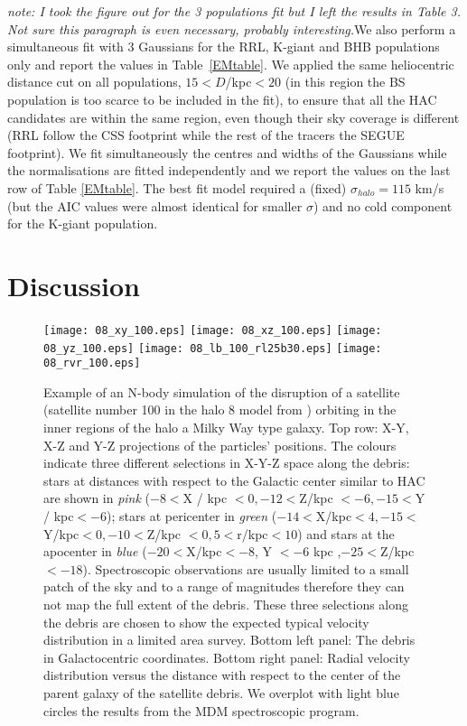 \documentclass[useAMS,usenatbib]{mn2e}
\begin{document}
\textit{note: I took the figure out for the 3 populations fit but I left the results in Table 3. Not sure this paragraph is even necessary, probably interesting.}We also perform a simultaneous fit with 3 Gaussians for the RRL, K-giant and BHB populations only and report the values in Table~\ref{EMtable}. We applied the same heliocentric distance cut on all populations, $15<D$/kpc$<20$ (in this region the BS population is too scarce to be included in the fit), to ensure that all the HAC candidates are within the same region, even though their sky coverage is different (RRL follow the CSS footprint while the rest of the tracers the SEGUE footprint). We fit simultaneously the centres and widths of the Gaussians while the normalisations are fitted independently and we report the values on the last row of Table \ref{EMtable}. The best fit model required a (fixed) $\sigma_{halo} = 115 $ km/s (but the AIC values were almost identical for smaller $\sigma$) and no cold component for the K-giant population. 
%
\section{Discussion}
\begin{figure*}
\hspace{-1.0cm}
\texttt{[image: 08\_xy\_100.eps]}
\texttt{[image: 08\_xz\_100.eps]}
\texttt{[image: 08\_yz\_100.eps]}
\texttt{[image: 08\_lb\_100\_rl25b30.eps]}
\texttt{[image: 08\_rvr\_100.eps]}
\caption{Example of an N-body simulation of the disruption of a satellite (satellite number 100 in the halo 8 model from \citealt{Jo08}) orbiting in the inner regions of the halo a Milky Way type galaxy. Top row: X-Y, X-Z and Y-Z projections of the particles' positions. The colours indicate three different selections in X-Y-Z space along the debris: stars at distances with respect to the Galactic center similar to HAC are shown in \textit{pink} ($-8< $X / kpc $< 0, -12<$Z/kpc $< -6, -15<$Y / kpc$ < -6$); stars at pericenter in \textit{green}  ($-14<$X/kpc$< 4, -15<$Y/kpc$ < 0 , -10<$Z/kpc $< 0, 5<$r/kpc$< 10$)  and stars at the apocenter in \textit{blue} ($ -20<$X/kpc$< -8$, Y $< -6$ kpc  ,$-25<$Z/kpc $< -18$). Spectroscopic observations are usually limited to a small patch of the sky and to a range of magnitudes therefore they can not map the full extent of the debris. These three selections along the debris are chosen to show the expected typical velocity distribution in a limited area survey. Bottom left panel: The debris in Galactocentric coordinates. Bottom right panel: Radial velocity distribution versus the distance with respect to the center of the parent galaxy of the satellite debris. We overplot with light blue circles the results from the MDM spectroscopic program. }
\label{Bullock}
\end{figure*}
\end{document}
